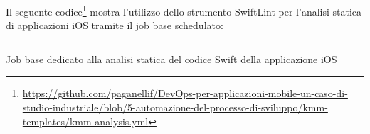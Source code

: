 Il seguente codice\footnote{\href{https://github.com/paganellif/DevOps-per-applicazioni-mobile-un-caso-di-studio-industriale/blob/5-automazione-del-processo-di-sviluppo/kmm-templates/kmm-analysis.yml}{https://github.com/paganellif/DevOps-per-applicazioni-mobile-un-caso-di-studio-industriale/blob/5-automazione-del-processo-di-sviluppo/kmm-templates/kmm-analysis.yml}} mostra l'utilizzo dello strumento SwiftLint per l'analisi statica di applicazioni iOS tramite il job base schedulato:

\begin{listing}[H]
    \inputminted{yaml}{code/ios-sast-job.yaml}
    \caption{Job base dedicato alla analisi statica del codice Swift della applicazione iOS}
\end{listing}
